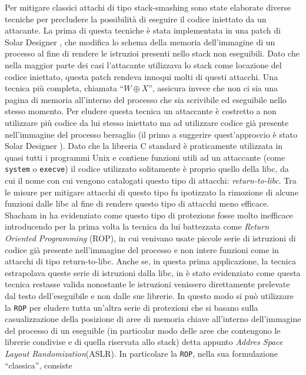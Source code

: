 Per mitigare classici attachi di tipo stack-smashing sono state
elaborate diverse tecniche per precludere la possibilità di eseguire
il codice iniettato da un attacante. La prima di questa tecniche è
stata implementata in una patch di Solar Designer \cite{stackpatch},
che modifica lo schema della memoria dell'immagine di un processo al
fine di rendere le istruzioi presenti nello stack non eseguibili. Dato
che nella maggior parte dei casi l'attacante utilizzava lo stack come
locazione del codice iniettato, questa patch rendeva innoqui molti di
questi attacchi. Una tecnica più completa, chiamata ``$W \oplus X$'',
assicura invece che non ci sia una pagina di memoria all'interno del
processo che sia scrivibile ed eseguibile nello stesso momento. Per
eludere questa tecnica un attaccante è costretto a non utilizzare più
codice da lui stesso iniettato ma ad utilizzare codice già presente
nell'immagine del processo bersaglio (il primo a suggerire
quest'approccio è stato Solar Designer
\cite{solar-return-to-libc}). Dato che la libreria C standard è
praticamente utilizzata in quasi tutti i programmi Unix e contiene
funzioni utili ad un attaccante (come \lstinline{system} o
\lstinline{execve}) il codice utilizzato solitamente è proprio quello
della libc, da cui il nome con cui vengono catalogati questo tipo di
attacchi: \emph{return-to-libc}. Tra le misure per mitigare attacchi
di questo tipo fu ipotizzato la rimozione di alcune funzioni dalle
libc al fine di rendere questo tipo di attacchi meno efficace. Shacham
in \cite{Shacham-2007} ha evidenziato come questo tipo di protezione
fosse molto inefficace introducendo per la prima volta la tecnica da
lui battezzata come \emph{Return Oriented Programming} (ROP), in cui
venivano usate piccole serie di istruzioni di codice già presente
nell'immagine del processo e non intere funzioni come in attacchi di
tipo return-to-libc. Anche se, in questa prima applicazione, la
tecnica estrapolava queste serie di istruzioni dalla libc, in
\cite{payla} è stato evidenziato come questa tecnica restasse valida
nonostante le istruzioni venissero direttamente prelevate dal testo
dell'eseguibile e non dalle sue librerie. In questo modo si può
utilizzare la \lstinline{ROP} per eludere tutta un'altra serie di
protezioni che si basano sulla casualizzazione della posizione di aree
di memoria chiave all'interno dell'immagine del processo di un
eseguible (in particolar modo delle aree che contengono le librerie
condivise e di quella riservata allo stack) detta appunto \emph{Addres
  Space Layout Randomization}(ASLR). In particolare la
\lstinline{ROP}, nella sua formulazione ``classica'', consiste
